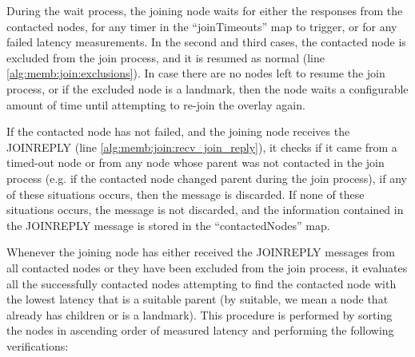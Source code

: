 During the wait process, the joining node waits for either the responses from the contacted nodes, for any timer in the ``joinTimeouts'' map to trigger, or for any failed latency measurements. In the second and third cases, the contacted node is excluded from the join process, and it is resumed as normal (line \ref{alg:memb:join:exclusions}). In case there are no nodes left to resume the join process, or if the excluded node is a landmark, then the node waits a configurable amount of time until attempting to re-join the overlay again. 

If the contacted node has not failed, and the joining node receives the JOINREPLY (line \ref{alg:memb:join:recv_join_reply}), it checks if it came from a timed-out node or from any node whose parent was not contacted in the join process (e.g. if the contacted node changed parent during the join process), if any of these situations occurs, then the message is discarded. If none of these situations occurs, the message is not discarded, and the information contained in the JOINREPLY message is stored in the ``contactedNodes'' map.

Whenever the joining node has either received the JOINREPLY messages from all contacted nodes or they have been excluded from the join process, it evaluates all the successfully contacted nodes attempting to find the contacted node with the lowest latency that is a suitable parent (by suitable, we mean a node that already has children or is a landmark). This procedure is performed by sorting the nodes in ascending order of measured latency and performing the following verifications:

